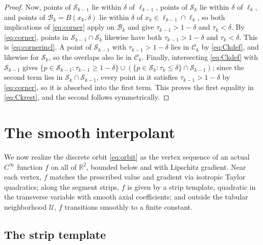 \documentclass[11pt]{article}
\newcommand{\R}{\mathbb{R}}
\begin{document}
\begin{proof}
Now, points of $\mathcal S_{k-1}$ lie within $\delta$ of $\ell_{k-1}$, points of $\mathcal S_k$ lie within $\delta$ of $\ell_k$, and points of $\mathcal B_k = B(x_k, \delta)$ lie within $\delta$ of $x_k \in \ell_{k-1} \cap \ell_k$, so both implications of \eqref{eq:corner} apply on $\mathcal B_k$ and give $\tau_{k-1}>1-\delta$ and $\tau_k<\delta$.
By \eqref{eq:corner}, points in $\mathcal S_{k-1} \cap \mathcal S_k$ likewise have both $\tau_{k-1} > 1-\delta$ and $\tau_k < \delta$. This is \eqref{eq:cornerincl}.
A point of $\mathcal S_{k-1}$ with $\tau_{k-1}>1-\delta$ lies in $\mathcal C_k$ by \eqref{eq:Ckdef}, and likewise for $\mathcal S_k$, so the overlaps also lie in $\mathcal C_k$.
Finally, intersecting \eqref{eq:Ckdef} with $\mathcal S_{k-1}$ gives $\{p \in \mathcal S_{k-1} : \tau_{k-1} \ge 1-\delta\} \cup (\{p \in \mathcal S_k : \tau_k \le \delta\} \cap \mathcal S_{k-1})$; since the second term lies in $\mathcal S_k \cap \mathcal S_{k-1}$, every point in it satisfies $\tau_{k-1} > 1-\delta$ by \eqref{eq:corner}, so it is absorbed into the first term. This proves the first equality in \eqref{eq:Ckrest}, and the second follows symmetrically.
\end{proof}

\section{The smooth interpolant}
\label{sec:f}

We now realize the discrete orbit \eqref{eq:orbit} as the vertex
sequence of an actual $C^\infty$ function $f$ on all of $\R^2$, bounded
below and with Lipschitz gradient.
Near each vertex, $f$ matches the prescribed value and gradient via isotropic Taylor quadratics; along the segment strips, $f$ is given by a strip template, quadratic in the transverse variable with smooth axial coefficients; and outside the tubular neighborhood $\mathcal U$, $f$ transitions smoothly to a finite constant.

\subsection{The strip template}
\label{sec:template}
\end{document}
